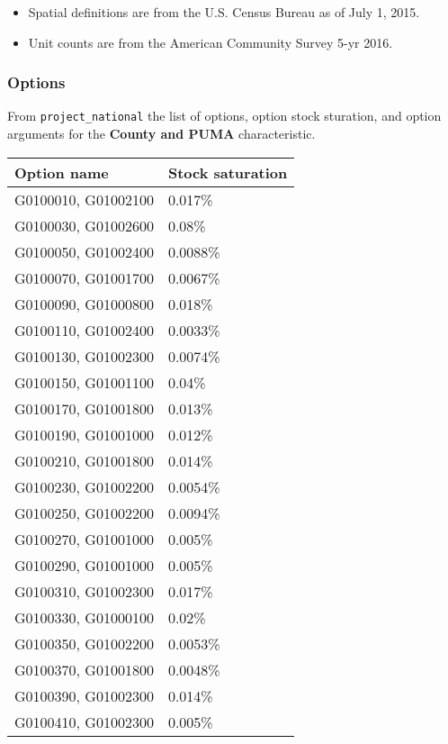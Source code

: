 \begin{itemize}
 
\item
  Spatial definitions are from the U.S. Census Bureau as of July 1,
  2015.
\item
  Unit counts are from the American Community Survey 5-yr 2016.
\end{itemize}

\subsubsection{Options}\label{options-29}

From \texttt{project\_national} the list of options, option stock
sturation, and option arguments for the \textbf{County and PUMA}
characteristic.

\begin{longtable}[]{@{}ll@{}}
\toprule\noalign{}
Option name & Stock saturation \\
\midrule\noalign{}
\endhead
\bottomrule\noalign{}
\endlastfoot
G0100010, G01002100 & 0.017\% \\
G0100030, G01002600 & 0.08\% \\
G0100050, G01002400 & 0.0088\% \\
G0100070, G01001700 & 0.0067\% \\
G0100090, G01000800 & 0.018\% \\
G0100110, G01002400 & 0.0033\% \\
G0100130, G01002300 & 0.0074\% \\
G0100150, G01001100 & 0.04\% \\
G0100170, G01001800 & 0.013\% \\
G0100190, G01001000 & 0.012\% \\
G0100210, G01001800 & 0.014\% \\
G0100230, G01002200 & 0.0054\% \\
G0100250, G01002200 & 0.0094\% \\
G0100270, G01001000 & 0.005\% \\
G0100290, G01001000 & 0.005\% \\
G0100310, G01002300 & 0.017\% \\
G0100330, G01000100 & 0.02\% \\
G0100350, G01002200 & 0.0053\% \\
G0100370, G01001800 & 0.0048\% \\
G0100390, G01002300 & 0.014\% \\
G0100410, G01002300 & 0.005\% \\

\end{longtable}
